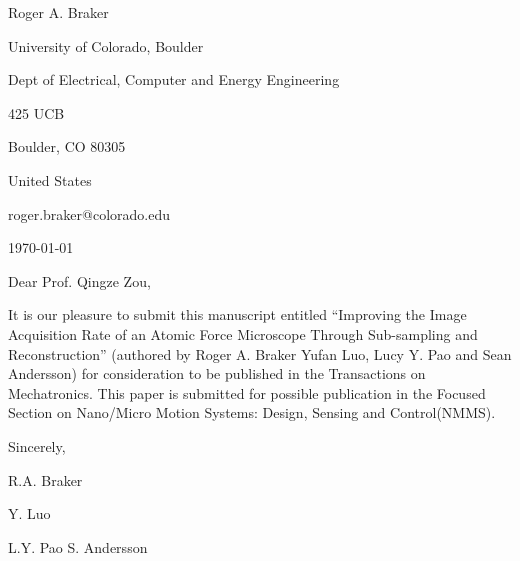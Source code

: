 \documentclass[a4paper,twoside]{article}
\begin{document}
\hspace*{0.45\linewidth}
\begin{minipage}{0.52\linewidth}
Roger A. Braker\par
University of Colorado, Boulder\par
Dept of Electrical, Computer and Energy Engineering \par
425 UCB\par
Boulder, CO 80305\par
United States\par
roger.braker@colorado.edu\par
\today
\end{minipage}
\par\bigskip

Dear Prof. Qingze Zou,\par\bigskip

It is our pleasure to submit this manuscript entitled ``Improving the Image Acquisition Rate of an Atomic Force Microscope Through Sub-sampling and Reconstruction'' (authored by Roger A. Braker Yufan Luo, Lucy Y. Pao and Sean Andersson) for consideration to be published in the Transactions on Mechatronics. This paper is submitted for possible publication in the Focused Section on Nano/Micro 
Motion  Systems:  Design,  Sensing  and  Control(NMMS).



\par\bigskip
\noindent Sincerely,
\par\bigskip
\noindent R.A. Braker\par
\noindent Y. Luo\par
\noindent L.Y. Pao
\noindent S. Andersson
\end{document}
